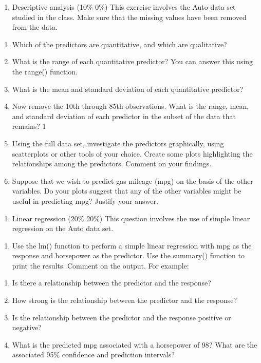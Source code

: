 \documentclass[]{article}
\providecommand{\tightlist}{%
  \setlength{\itemsep}{0pt}\setlength{\parskip}{0pt}}
\begin{document}
\begin{enumerate}
\def\labelenumi{\arabic{enumi}.}
\setcounter{enumi}{2}
\tightlist
\item
  Descriptive analysis (10\% \textbar{} 0\%) This exercise involves the
  Auto data set studied in the class. Make sure that the missing values
  have been removed from the data.
\end{enumerate}

\begin{enumerate}
\def\labelenumi{(\alph{enumi})}
\tightlist
\item
  Which of the predictors are quantitative, and which are qualitative?
\item
  What is the range of each quantitative predictor? You can answer this
  using the range() function.
\item
  What is the mean and standard deviation of each quantitative
  predictor?
\item
  Now remove the 10th through 85th observations. What is the range,
  mean, and standard deviation of each predictor in the subset of the
  data that remains? 1
\item
  Using the full data set, investigate the predictors graphically, using
  scatterplots or other tools of your choice. Create some plots
  highlighting the relationships among the predictors. Comment on your
  findings.
\item
  Suppose that we wish to predict gas mileage (mpg) on the basis of the
  other variables. Do your plots suggest that any of the other variables
  might be useful in predicting mpg? Justify your answer.
\end{enumerate}

\begin{enumerate}
\def\labelenumi{\arabic{enumi}.}
\setcounter{enumi}{3}
\tightlist
\item
  Linear regression (20\% \textbar{} 20\%) This question involves the
  use of simple linear regression on the Auto data set.
\end{enumerate}

\begin{enumerate}
\def\labelenumi{(\alph{enumi})}
\tightlist
\item
  Use the lm() function to perform a simple linear regression with mpg
  as the response and horsepower as the predictor. Use the summary()
  function to print the results. Comment on the output. For example:
\end{enumerate}

\begin{enumerate}
\def\labelenumi{\roman{enumi}.}
\tightlist
\item
  Is there a relationship between the predictor and the response?
\item
  How strong is the relationship between the predictor and the response?
\item
  Is the relationship between the predictor and the response positive or
  negative?
\item
  What is the predicted mpg associated with a horsepower of 98? What are
  the associated 95\% confidence and prediction intervals?
\end{enumerate}
\end{document}
